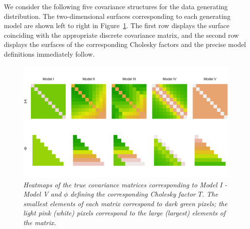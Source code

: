 \documentclass[12pt]{article}
\begin{document}
We consider the following five covariance structures for the data generating distribution. The two-dimensional surfaces corresponding to each generating model are shown left to right in Figure~\ref{fig:true-covariance-heatmaps}. The first row displays the surface coinciding with the appropriate discrete covariance matrix, and the second row displays the surfaces of the corresponding Cholesky factors and the precise model definitions immediately follow. 
\begin{figure}[H] 
\begin{center}
\setlength{\belowcaptionskip}{-12pt}
\setlength{\abovecaptionskip}{-12pt}
  \includegraphics[width = 1.1\textwidth]{img/cov-cholesky-grid}%
\caption{\textit{Heatmaps of the true covariance matrices corresponding to Model I - Model V and $\phi$ defining the corresponding Cholesky factor $T$. The smallest elements of each matrix correspond to dark green pixels; the light pink (white) pixels correspond to the large (largest) elements of the matrix.} } \label{fig:true-covariance-heatmaps}
\end{center}
\end{figure}
\end{document}

